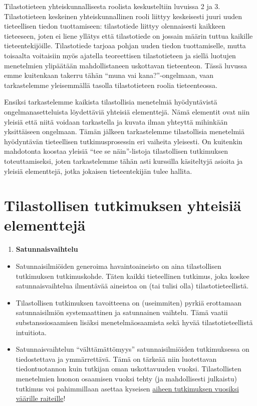 \documentclass[
]{book}
\providecommand{\tightlist}{%
  \setlength{\itemsep}{0pt}\setlength{\parskip}{0pt}}
\begin{document}
Tilastotieteen yhteiskunnallisesta roolista keskusteltiin luvuissa 2 ja 3. Tilastotieteen keskeinen yhteiskunnallinen rooli liittyy keskeisesti juuri uuden tieteellisen tiedon tuottamiseen: tilastotiede liittyy olennaisesti kaikkeen tieteeseen, joten ei liene yllätys että tilastotiede on jossain määrin tuttua kaikille tieteentekijöille. Tilastotiede tarjoaa pohjan uuden tiedon tuottamiselle, mutta toisaalta voitaisiin myös ajatella teoreettisen tilastotieteen ja siellä luotujen menetelmien ylipäätään mahdollistaneen uskottavan tieteenteon. Tässä luvussa emme kuitenkaan takerru tähän ``muna vai kana?''-ongelmaan, vaan tarkastelemme yleisemmällä tasolla tilastotieteen roolia tieteenteossa.

Ensiksi tarkastelemme kaikista tilastollisia menetelmiä hyödyntävistä ongelmanasetteluista löydettäviä yhteisiä elementtejä. Nämä elementit ovat niin yleisiä että niitä voidaan tarkastella ja kuvata ilman yhteyttä mihinkään yksittäiseen ongelmaan. Tämän jälkeen tarkastelemme tilastollisia menetelmiä hyödyntävän tieteellisen tutkimusprosessin eri vaiheita yleisesti. On kuitenkin mahdotonta koostaa yleisiä ``tee se näin''-listoja tilastollisen tutkimuksen toteuttamiseksi, joten tarkastelemme tähän asti kurssilla käsiteltyjä asioita ja yleisiä elementtejä, jotka jokaisen tieteentekijän tulee hallita.

\hypertarget{alaluku111}{%
\section{Tilastollisen tutkimuksen yhteisiä elementtejä}\label{alaluku111}}

\begin{enumerate}
\def\labelenumi{\arabic{enumi}.}
\tightlist
\item
  \textbf{Satunnaisvaihtelu}
\end{enumerate}

\begin{itemize}
\tightlist
\item
  Satunnaisilmiöiden generoima havaintoaineisto on aina tilastollisen tutkimuksen tutkimuskohde. Täten kaikki tieteellinen tutkimus, joka koskee satunnaisvaihtelua ilmentävää aineistoa on (tai tulisi olla) tilastotieteellistä.
\item
  Tilastollisen tutkimuksen tavoitteena on (useimmiten) pyrkiä erottamaan satunnaisilmiön systemaattinen ja satunnainen vaihtelu. Tämä vaatii substanssiosaamisen lisäksi menetelmäosaamista sekä hyvää tilastotieteellistä intuitiota.
\item
  Satunnaisvaihtelun ``välttämättömyys'' satunnaisilmiöiden tutkimuksessa on tiedostettava ja ymmärrettävä. Tämä on tärkeää niin luotettavan tiedontuotannon kuin tutkijan oman uskottavuuden vuoksi. Tilastollisten menetelmien huonon osaamisen vuoksi tehty (ja mahdollisesti julkaistu) tutkimus voi pahimmillaan asettaa kyseisen \href{https://www.nbcnews.com/science/science-news/alzheimers-theory-undermined-accusations-fabricated-research-rcna39843}{aiheen tutkimuksen vuosiksi väärille raiteille}!
\end{itemize}
\end{document}
